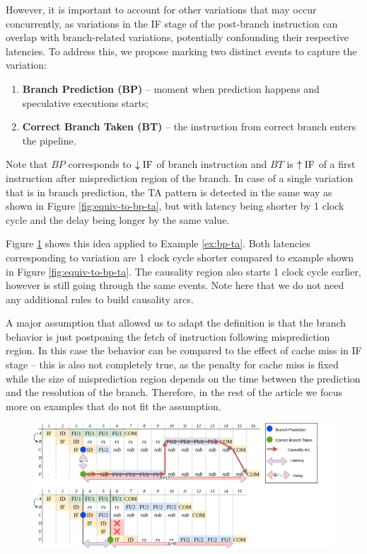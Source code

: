 However, it is important to account for other variations that may occur concurrently, as variations in the IF stage of the post-branch instruction can overlap with branch-related variations, potentially confounding their respective latencies. To address this, we propose marking two distinct events to capture the variation:


\begin{enumerate}
    \item \textbf{Branch Prediction (BP)} -- moment when prediction happens and speculative executions starts;
    \item \textbf{Correct Branch Taken (BT)} -- the instruction from correct branch enters the pipeline.
\end{enumerate}

Note that $BP$ corresponds to $\downarrow\mathrm{IF}$ of branch instruction and $BT$ is $\uparrow\mathrm{IF}$ of a first instruction after misprediction region of the branch. In case of a single variation that is in branch prediction, the TA pattern is detected in the same way as shown in Figure \ref{fig:equiv-to-bp-ta}, but with latency being shorter by 1 clock cycle  and the delay being longer by the same value.

Figure \ref{fig:bp-ta-analysed} shows this idea applied to Example \ref{ex:bp-ta}. Both latencies corresponding to variation are 1 clock cycle shorter compared to example shown in Figure \ref{fig:equiv-to-bp-ta}. The causality region also starts 1 clock cycle earlier, however is still going through the same events. Note here that we do not need any additional rules to build causality arcs.

A major assumption that allowed us to adapt the definition is that the branch behavior is just postponing the fetch of instruction following misprediction region. In this case the behavior can be compared to the effect of cache miss in IF stage -- this is also not completely true, as the penalty for cache miss is fixed while the size of misprediction region depends on the time between the prediction and the resolution of the branch. Therefore, in the rest of the article we focus more on examples that do not fit the assumption.



\begin{figure}[H]
    \centering
    \includegraphics[width=\textwidth]{figures/simple-branch-ta-analysed.png}
    \caption{\TODO{}}
    \label{fig:bp-ta-analysed}
\end{figure}

